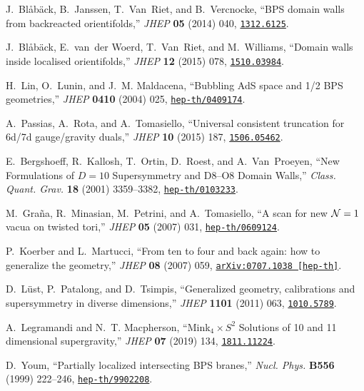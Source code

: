 \documentclass[12pt]{article}
\begin{document}
\begin{thebibliography}{10}
J.~{Bl\aa b\"ack}, B.~Janssen, T.~Van~Riet, and B.~Vercnocke, ``{BPS domain
  walls from backreacted orientifolds},'' {\em JHEP} {\bf 05} (2014) 040,
\href{http://arXiv.org/abs/1312.6125}{{\tt 1312.6125}}.


J.~{Bl\aa b\"ack}, E.~van~der Woerd, T.~Van~Riet, and M.~Williams, ``{Domain
  walls inside localised orientifolds},'' {\em JHEP} {\bf 12} (2015) 078,
\href{http://arXiv.org/abs/1510.03984}{{\tt 1510.03984}}.


H.~Lin, O.~Lunin, and J.~M. Maldacena, ``{Bubbling AdS space and 1/2 BPS
  geometries},'' {\em JHEP} {\bf 0410} (2004) 025,
\href{http://arXiv.org/abs/hep-th/0409174}{{\tt hep-th/0409174}}.


A.~Passias, A.~Rota, and A.~Tomasiello, ``{Universal consistent truncation for
  6d/7d gauge/gravity duals},'' {\em JHEP} {\bf 10} (2015) 187,
\href{http://arXiv.org/abs/1506.05462}{{\tt 1506.05462}}.


E.~Bergshoeff, R.~Kallosh, T.~Ortin, D.~Roest, and A.~Van~Proeyen, ``{New
  Formulations of {$D=10$} Supersymmetry and {D8--O8} Domain Walls},'' {\em
  Class. Quant. Grav.} {\bf 18} (2001) 3359--3382,
\href{http://arXiv.org/abs/hep-th/0103233}{{\tt hep-th/0103233}}.


M.~Gra{\~n}a, R.~Minasian, M.~Petrini, and A.~Tomasiello, ``A scan for new
  {${\cal N}=1$} vacua on twisted tori,'' {\em JHEP} {\bf 05} (2007) 031,
\href{http://arXiv.org/abs/hep-th/0609124}{{\tt hep-th/0609124}}.


P.~Koerber and L.~Martucci, ``From ten to four and back again: how to
  generalize the geometry,'' {\em JHEP} {\bf 08} (2007) 059,
\href{http://arXiv.org/abs/arXiv:0707.1038 [hep-th]}{{\tt arXiv:0707.1038
  [hep-th]}}.


D.~{L\"ust}, P.~Patalong, and D.~Tsimpis, ``{Generalized geometry, calibrations
  and supersymmetry in diverse dimensions},'' {\em JHEP} {\bf 1101} (2011) 063,
  \href{http://arXiv.org/abs/1010.5789}{{\tt 1010.5789}}.

A.~Legramandi and N.~T. Macpherson, ``{Mink$_4\times S^2$ Solutions of 10 and
  11 dimensional supergravity},'' {\em JHEP} {\bf 07} (2019) 134,
\href{http://arXiv.org/abs/1811.11224}{{\tt 1811.11224}}.


D.~Youm, ``{Partially localized intersecting BPS branes},'' {\em Nucl. Phys.}
  {\bf B556} (1999) 222--246,
\href{http://arXiv.org/abs/hep-th/9902208}{{\tt hep-th/9902208}}.



\end{thebibliography}
\end{document}
